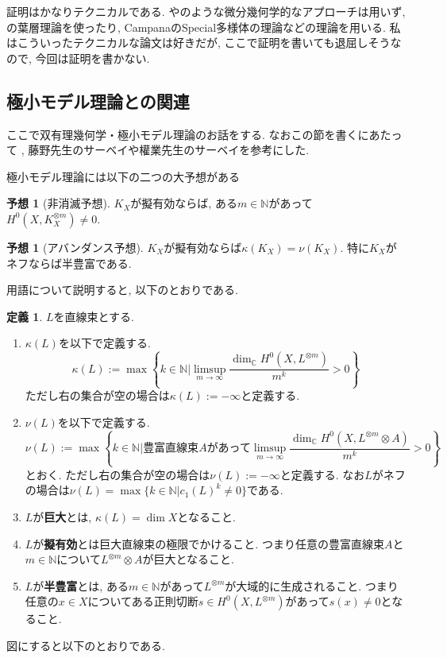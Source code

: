 \documentclass[dvipdfmx]{msjproc}
\theoremstyle{definition}
\newtheorem{dfn}[thm]{定義}
\newtheorem{conj}[thm]{予想}
\newcommand{\N}{\mathbb{N}}
\newcommand{\C}{\mathbb{C}}
\begin{document}
証明はかなりテクニカルである. \cite{Yau77}や\cite{CO75}のような微分幾何学的なアプローチは用いず, 
\cite{PRT22}の葉層理論を使ったり, CampanaのSpecial多様体の理論などの理論を用いる.  
私はこういったテクニカルな論文は好きだが, ここで証明を書いても退屈しそうなので, 今回は証明を書かない. 

\subsection{極小モデル理論との関連}

ここで双有理幾何学・極小モデル理論のお話をする.
なおこの節を書くにあたって , 藤野先生のサーベイ\cite{FujSur}や權業先生のサーベイ\cite{GonSur}を参考にした.

極小モデル理論には以下の二つの大予想がある

\begin{conj}[非消滅予想]
\label{conj-nonvanishing}
$K_X$が擬有効ならば, ある$m \in \N$があって $H^0(X,K_{X}^{\otimes m})\neq0$.
\end{conj}

\begin{conj}[アバンダンス予想]
\label{conj-Abundance}
$K_X$が擬有効ならば$\kappa(K_X)=\nu(K_X)$. 
特に$K_X$がネフならば半豊富である.
\end{conj}

用語について説明すると, 以下のとおりである.
\begin{dfn}\cite[Section 6]{Dem12}\cite{GonSur}
$L$を直線束とする. 
\begin{enumerate}
  \setlength{\parskip}{0cm} 
  \setlength{\itemsep}{0cm} 
\item $\kappa(L)$を以下で定義する. 
$$\kappa(L) :=\max
 \left\{
 k \in \N |
\limsup_{m \to \infty}\frac{\dim_{\C}H^0(X, L^{\otimes m})}{m^k} >0 
\right\}
$$
ただし右の集合が空の場合は$\kappa(L):= -\infty$と定義する. 
\item $\nu(L)$を以下で定義する. 
$$
\nu(L) :=\max
 \left\{
 k\in \N | \text{豊富直線束$A$があって}
\limsup_{m \to \infty}
\frac{\dim_{\C}H^0(X, L^{ \otimes m}\otimes A)}{m^k} >0
\right\}
$$
とおく. ただし右の集合が空の場合は$\nu(L):= -\infty$と定義する. 
なお$L$がネフの場合は$\nu(L) = \max\{ k \in \N | c_1(L)^{k} \neq 0 \}$である.
\item $L$が{\bf 巨大}とは, $\kappa(L) = \dim X$となること. 
\item $L$が{\bf 擬有効}とは巨大直線束の極限でかけること. つまり任意の豊富直線束$A$と$m \in \N$について$L ^{\otimes m} \otimes A$が巨大となること. 
\item $L$が{\bf 半豊富}とは, ある$m \in \N$があって$L^{\otimes m}$が大域的に生成されること. 
つまり任意の$x \in X$についてある正則切断$s \in H^0 (X, L^{\otimes m}) $があって$s(x)\neq 0$となること. 
\end{enumerate}
\end{dfn}
図にすると以下のとおりである. 
\end{document}
